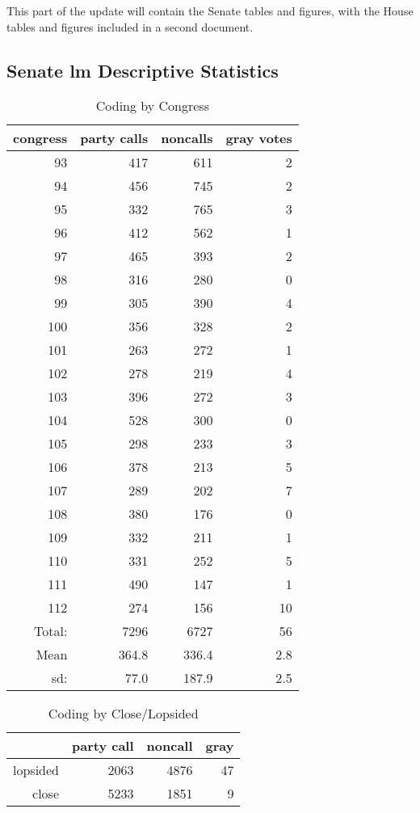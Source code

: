 \documentclass[12pt]{article}
\begin{document}
This part of the update will contain the Senate tables and figures, with the House tables and figures included in a second document.

\subsection{Senate lm Descriptive Statistics}

\begin{table}[ht]
	\centering
	\caption{Coding by Congress}
	\begin{tabular}{rrrr}
		\hline
		congress & party calls & noncalls & gray votes \\ 
		\hline
		93 & 417 & 611 &   2 \\ 
		94 & 456 & 745 &   2 \\ 
		95 & 332 & 765 &   3 \\ 
		96 & 412 & 562 &   1 \\ 
		97 & 465 & 393 &   2 \\ 
		98 & 316 & 280 &   0 \\ 
		99 & 305 & 390 &   4 \\ 
		100 & 356 & 328 &   2 \\ 
		101 & 263 & 272 &   1 \\ 
		102 & 278 & 219 &   4 \\ 
		103 & 396 & 272 &   3 \\ 
		104 & 528 & 300 &   0 \\ 
		105 & 298 & 233 &   3 \\ 
		106 & 378 & 213 &   5 \\ 
		107 & 289 & 202 &   7 \\ 
		108 & 380 & 176 &   0 \\ 
		109 & 332 & 211 &   1 \\ 
		110 & 331 & 252 &   5 \\ 
		111 & 490 & 147 &   1 \\ 
		112 & 274 & 156 &  10 \\ 
		\hline
		Total: & 7296 & 6727 & 56 \\
		Mean & 364.8 & 336.4 & 2.8 \\
		sd: & 77.0 & 187.9 & 2.5 \\
		\hline
	\end{tabular}
\end{table}

\begin{table}[ht]
	\centering
	\caption{Coding by Close/Lopsided}
	\begin{tabular}{rrrr}
		\hline
		& party call & noncall & gray \\ 
		\hline
		lopsided & 2063 & 4876 &  47 \\ 
		close & 5233 & 1851 &   9 \\ 
		\hline
	\end{tabular}
\end{table}
\end{document}

